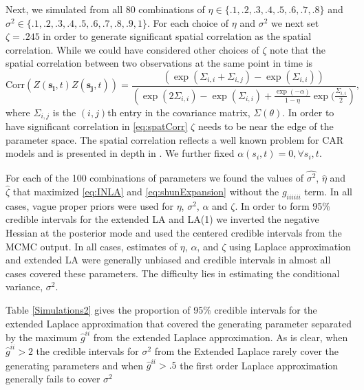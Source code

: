\documentclass[11pt]{isuthesis}
\begin{document}
	
	Next, we simulated from all 80 combinations of $\eta \in \{.1,.2,.3,.4,.5,.6,.7,.8\}$ and $\sigma^2 \in \{.1,.2,.3,.4,.5,.6,.7,.8,.9,1\}$.  For each choice of $\eta$ and $\sigma^2$ we next set $\zeta=.245$ in order to generate significant spatial correlation as the spatial correlation.  While we could have considered other choices of $\zeta$ note that the spatial correlation between two observations at the same point in time is
	\begin{equation}
	\mbox{Corr}(Z(\boldsymbol{s_i},t)Z(\boldsymbol{s_j},t))  = \frac{\left(\exp(\Sigma_{i,i}+\Sigma_{i,j}) -\exp(\Sigma_{i,i})\right)}{\left(\exp(2\Sigma_{i,i}) -\exp(\Sigma_{i,i}) + \frac{\exp(-\alpha)}{1-\eta}\exp(\frac{\Sigma_{i,i}}{2}\right)}\label{eq:spatCorr},
	\end{equation}
	where $\Sigma_{i,j}$ is the $(i,j)$th entry in the covariance matrix, $\Sigma(\theta)$.  In order to have significant correlation in \eqref{eq:spatCorr} $\zeta$ needs to be near the edge of the parameter space.  The spatial correlation reflects a well known problem for CAR models and is presented in depth in \cite{wall2004close}.  We further fixed $\alpha(s_i,t)=0,\forall s_i,t$. 
	
	For each of the 100 combinations of parameters we found the values of $\hat{\sigma^2}$, $\hat{\eta}$ and $\hat{\zeta}$ that maximized \eqref{eq:INLA} and \eqref{eq:shunExpansion} without the $g_{iiiiii}$ term.  In all cases, vague proper priors were used for $\eta$, $\sigma^2$, $\alpha$ and $\zeta$.  In order to form 95\% credible intervals for the extended LA and LA(1) we inverted the negative Hessian at the posterior mode and used the centered credible intervals from the MCMC output. In all cases, estimates of $\eta$, $\alpha$, and $\zeta$ using Laplace approximation and extended LA were generally unbiased and credible intervals in almost all cases covered these parameters.  The difficulty lies in estimating the conditional variance, $\sigma^2$.  
	
	 Table \ref{Simulations2} gives the proportion of 95\% credible intervals for the extended Laplace approximation that covered the generating parameter separated by the maximum $\hat{g}^{ii}$ from the extended Laplace approximation.  As is clear, when $\hat{g}^{ii}>2$ the credible intervals for $\sigma^2$ from the Extended Laplace rarely cover the generating parameters and when $\hat{g}^{ii}>.5$ the first order Laplace approximation generally fails to cover $\sigma^2$
	
\end{document}
